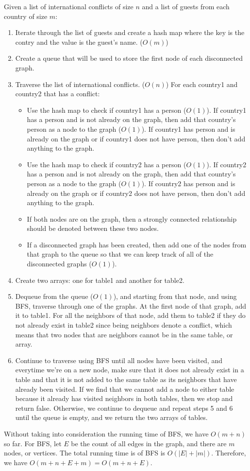 \documentclass{article}
\begin{document}
\noindent Given a list of international conflicts of size $n$ and a list of guests from each country of size $m$:\\
\begin{enumerate}
\item Iterate through the list of guests and create a hash map where the key is the contry and the value is the guest's name. ($O(m)$)
\item Create a queue that will be used to store the first node of each disconnected graph.
\item Traverse the list of international conflicts. ($O(n)$) For each country1 and country2 that has a conflict:
\begin{itemize}
\item Use the hash map to check if country1 has a person ($O(1)$). If country1 has a person and is not already on the graph, then add that country's person as a node to the graph ($O(1)$). If country1 has person and is already on the graph or if country1 does not have person, then don't add anything to the graph.
\item Use the hash map to check if country2 has a person ($O(1)$). If country2 has a person and is not already on the graph, then add that country's person as a node to the graph ($O(1)$). If country2 has person and is already on the graph or if country2 does not have person, then don't add anything to the graph.
\item If both nodes are on the graph, then a strongly connected relationship should be denoted between these two nodes.
\item If a disconnected graph has been created, then add one of the nodes from that graph to the queue so that we can keep track of all of the disconnected graphs ($O(1)$).
\end{itemize}
\item Create two arrays: one for table1 and another for table2.
\item Dequeue from the queue ($O(1)$), and starting from that node, and using BFS, traverse through one of the graphs. At the first node of that graph, add it to table1. For all the neighbors of that node, add them to table2 if they do not already exist in table2 since being neighbors denote a conflict, which means that two nodes that are neighbors cannot be in the same table, or array.
\item Continue to traverse using BFS until all nodes have been visited, and everytime we're on a new node, make sure that it does not already exist in a table and that it is not added to the same table as its neighbors that have already been visited. If we find that we cannot add a node to either table because it already has visited neighbors in both tables, then we stop and return false. Otherwise, we continue to dequeue and repeat steps 5 and 6 until the queue is empty, and we return the two arrays of tables.
\end{enumerate}

\noindent Without taking into consideration the running time of BFS, we have $O(m+n)$ so far. For BFS, let $E$ be the count of all edges in the graph, and there are $m$ nodes, or vertices. The total running time is of BFS is $O(|E|+|m|)$. Therefore, we have $O(m+n+E+m) = O(m+n+E)$.
\end{document}
